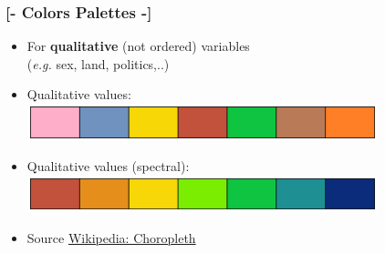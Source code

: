 \documentclass[xcolor=x11names,compress]{beamer}
\renewcommand{\(}{\begin{columns}}
\renewcommand{\)}{\end{columns}}
\newcommand{\<}[1]{\begin{column}{#1}}
\renewcommand{\>}{\end{column}}
\begin{document}
%


\begin{frame} %
\frametitle{\textcolor{brique}{[-  \textbf{Colors Palettes} -]}}
\begin{center}
\begin{itemize}[<+-|alert@+>]
    \item[] For \textbf{qualitative} (not ordered) variables \\ (\textit{e.g.} sex, land, politics,..)
    \item Qualitative values: \hfill \includegraphics[width = 0.8\textwidth]{M5-ColorPaletteQualitative.png}
    \item Qualitative values (spectral): \hfill \includegraphics[width = 0.8\textwidth]{M5-ColorPaletteFullSpectral.png}
    \item[] \textcolor{gris}{\footnotesize{Source \href{https://en.wikipedia.org/wiki/Choropleth_map}{Wikipedia: Choropleth}}}
\end{itemize}
\end{center}
\end{frame}
\end{document}
